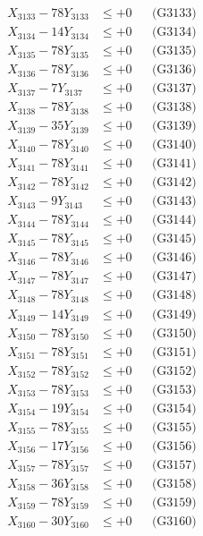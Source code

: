 \documentclass[a4paper,10pt]{article}
\begin{document}
{\begin{align}
X_{3133} - 78Y_{3133} &\leq +0 && \text{(G3133)} \\
X_{3134} - 14Y_{3134} &\leq +0 && \text{(G3134)} \\
X_{3135} - 78Y_{3135} &\leq +0 && \text{(G3135)} \\
X_{3136} - 78Y_{3136} &\leq +0 && \text{(G3136)} \\
X_{3137} - 7Y_{3137} &\leq +0 && \text{(G3137)} \\
X_{3138} - 78Y_{3138} &\leq +0 && \text{(G3138)} \\
X_{3139} - 35Y_{3139} &\leq +0 && \text{(G3139)} \\
X_{3140} - 78Y_{3140} &\leq +0 && \text{(G3140)} \\
\allowbreak
X_{3141} - 78Y_{3141} &\leq +0 && \text{(G3141)} \\
X_{3142} - 78Y_{3142} &\leq +0 && \text{(G3142)} \\
X_{3143} - 9Y_{3143} &\leq +0 && \text{(G3143)} \\
X_{3144} - 78Y_{3144} &\leq +0 && \text{(G3144)} \\
X_{3145} - 78Y_{3145} &\leq +0 && \text{(G3145)} \\
X_{3146} - 78Y_{3146} &\leq +0 && \text{(G3146)} \\
X_{3147} - 78Y_{3147} &\leq +0 && \text{(G3147)} \\
X_{3148} - 78Y_{3148} &\leq +0 && \text{(G3148)} \\
X_{3149} - 14Y_{3149} &\leq +0 && \text{(G3149)} \\
X_{3150} - 78Y_{3150} &\leq +0 && \text{(G3150)} \\
\allowbreak
X_{3151} - 78Y_{3151} &\leq +0 && \text{(G3151)} \\
X_{3152} - 78Y_{3152} &\leq +0 && \text{(G3152)} \\
X_{3153} - 78Y_{3153} &\leq +0 && \text{(G3153)} \\
X_{3154} - 19Y_{3154} &\leq +0 && \text{(G3154)} \\
X_{3155} - 78Y_{3155} &\leq +0 && \text{(G3155)} \\
X_{3156} - 17Y_{3156} &\leq +0 && \text{(G3156)} \\
X_{3157} - 78Y_{3157} &\leq +0 && \text{(G3157)} \\
X_{3158} - 36Y_{3158} &\leq +0 && \text{(G3158)} \\
X_{3159} - 78Y_{3159} &\leq +0 && \text{(G3159)} \\
X_{3160} - 30Y_{3160} &\leq +0 && \text{(G3160)} \\
\allowbreak

\end{align}}
\end{document}
